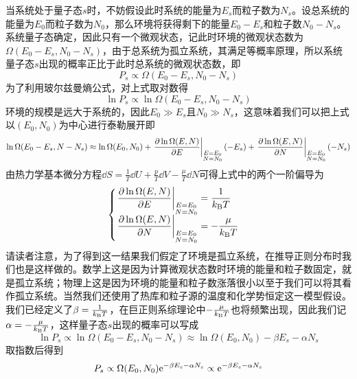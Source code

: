 \documentclass[../../main.tex]{subfiles}
\begin{document}
当系统处于量子态\(s\)时，不妨假设此时系统的能量为\(E_s\)而粒子数为\(N_s\)。设总系统的能量为\(E_0\)而粒子数为\(N_0\)，那么环境将获得剩下的能量\(E_0-E_s\)和粒子数\(N_0-N_s\)。系统量子态确定，因此只有一个微观状态，记此时环境的微观状态数为\(\Omega(E_0-E_s,N_0-N_s)\)，由于总系统为孤立系统，其满足等概率原理，所以系统量子态\(s\)出现的概率正比于此时总系统的微观状态数，即
\begin{equation}
    P_s\propto \Omega(E_0-E_s,N_0-N_s)
\end{equation}
为了利用玻尔兹曼熵公式，对上式取对数得
\begin{equation*}
    \ln P_s \propto \ln \Omega(E_0-E_s,N_0-N_s)
\end{equation*}
环境的规模是远大于系统的，因此\(E_0\gg E_s\)且\(N_0 \gg N_s\)，这意味着我们可以把上式以\((E_0,N_0)\)为中心进行泰勒展开即
\begin{equation}
    \ln\Omega(E_0-E_s,N-N_s)\approx \ln\Omega(E_0,N_0)+\left.\pdv{\ln\Omega(E,N)}{E}\right|_{\substack{E=E_0 \\ N=N_0}}(-E_s)+\left.\pdv{\ln\Omega(E,N)}{N}\right|_{\substack{E=E_0 \\ N=N_0}}(-N_s)
\end{equation}
由热力学基本微分方程\(\dd S=\frac{1}{T}\dd U+\frac{p}{T}\dd V-\frac{\mu}{T}\dd N\)可得上式中的两个一阶偏导为
\begin{equation}
    \begin{cases}
        \displaystyle \left.\pdv{\ln\Omega(E,N)}{E}\right|_{\substack{E=E_0 \\ N=N_0}}=\frac{1}{k_{\mathrm{B}} T} \\
        \displaystyle \left.\pdv{\ln\Omega(E,N)}{N}\right|_{\substack{E=E_0 \\ N=N_0}}=-\frac{\mu}{k_{\mathrm{B}} T}
    \end{cases}
\end{equation}
请读者注意，为了得到这一结果我们假定了环境是孤立系统，在推导正则分布时我们也是这样做的。数学上这是因为计算微观状态数时环境的能量和粒子数固定，就是孤立系统；物理上这是因为环境的能量和粒子数涨落很小以至于我们可以将其看作孤立系统。当然我们还使用了热库和粒子源的温度和化学势恒定这一模型假设。我们已经定义了\(\beta=\frac{1}{k_{\mathrm{B}} T}\)，在巨正则系综理论中\(-\frac{\mu}{k_{\mathrm{B}} T}\)也将频繁出现，因此我们记\(\alpha=-\frac{\mu}{k_{\mathrm{B}} T}\)，这样量子态\(s\)出现的概率可以写成
\begin{equation}
    \ln P_s \propto \ln \Omega(E_0-E_s,N_0-N_s)\approx \ln\Omega(E_0,N_0)-\beta E_s-\alpha N_s
\end{equation}
取指数后得到
\begin{equation}
    P_s\propto\Omega(E_0,N_0)\mathrm{e}^{-\beta E_s-\alpha N_s} \propto \mathrm{e}^{-\beta E_s-\alpha N_s}
\end{equation}
\end{document}
